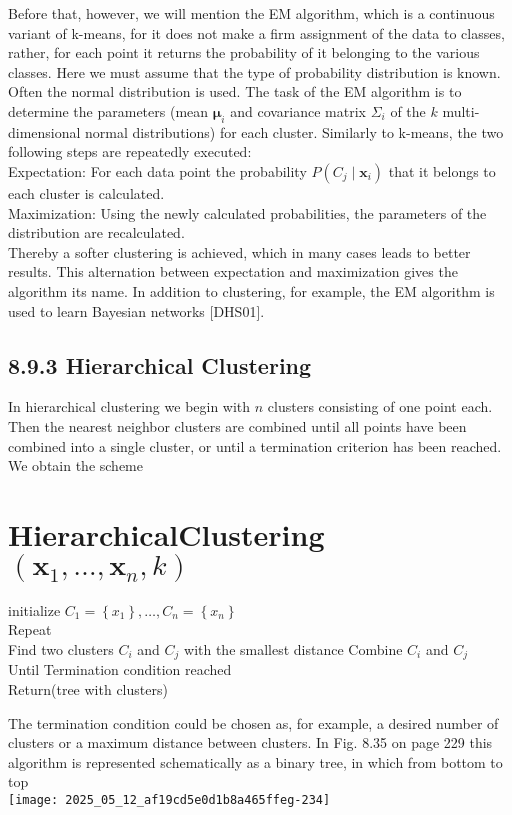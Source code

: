 \documentclass[10pt]{article}
\begin{document}
Before that, however, we will mention the EM algorithm, which is a continuous variant of k-means, for it does not make a firm assignment of the data to classes, rather, for each point it returns the probability of it belonging to the various classes. Here we must assume that the type of probability distribution is known. Often the normal distribution is used. The task of the EM algorithm is to determine the parameters (mean $\boldsymbol{\mu}_{i}$ and covariance matrix $\Sigma_{i}$ of the $k$ multi-dimensional normal distributions) for each cluster. Similarly to k-means, the two following steps are repeatedly executed:\\
Expectation: For each data point the probability $P\left(C_{j} \mid \boldsymbol{x}_{i}\right)$ that it belongs to each cluster is calculated.\\
Maximization: Using the newly calculated probabilities, the parameters of the distribution are recalculated.\\[0pt]
Thereby a softer clustering is achieved, which in many cases leads to better results. This alternation between expectation and maximization gives the algorithm its name. In addition to clustering, for example, the EM algorithm is used to learn Bayesian networks [DHS01].

\subsection*{8.9.3 Hierarchical Clustering}
In hierarchical clustering we begin with $n$ clusters consisting of one point each. Then the nearest neighbor clusters are combined until all points have been combined into a single cluster, or until a termination criterion has been reached. We obtain the scheme

\section*{HierarchicalClustering $\left(\boldsymbol{x}_{1}, \ldots, \boldsymbol{x}_{n}, k\right)$}
initialize $C_{1}=\left\{x_{1}\right\}, \ldots, C_{n}=\left\{x_{n}\right\}$\\
Repeat\\
Find two clusters $C_{i}$ and $C_{j}$ with the smallest distance Combine $C_{i}$ and $C_{j}$\\
Until Termination condition reached\\
Return(tree with clusters)

The termination condition could be chosen as, for example, a desired number of clusters or a maximum distance between clusters. In Fig. 8.35 on page 229 this algorithm is represented schematically as a binary tree, in which 
from bottom to top\\
\texttt{[image: 2025\_05\_12\_af19cd5e0d1b8a465ffeg-234]}
\end{document}
